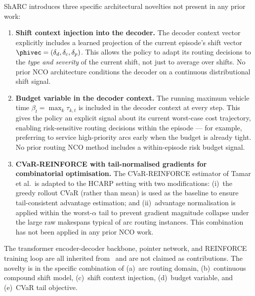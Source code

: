 \documentclass[11pt]{article}
\begin{document}
ShARC introduces three specific architectural novelties not present in any
prior work:

\begin{enumerate}
    \item \textbf{Shift context injection into the decoder.}
    The decoder context vector explicitly includes a learned projection of
    the current episode's shift vector $\phivec = (\delta_d, \delta_c,
    \delta_p)$.  This allows the policy to adapt its routing decisions
    to the \emph{type and severity} of the current shift, not just to
    average over shifts.  No prior NCO architecture conditions the decoder
    on a continuous distributional shift signal.

    \item \textbf{Budget variable in the decoder context.}
    The running maximum vehicle time $\beta_t = \max_k \tau_{k,t}$ is
    included in the decoder context at every step.  This gives the policy
    an explicit signal about its current worst-case cost trajectory,
    enabling risk-sensitive routing decisions within the episode --- for
    example, preferring to service high-priority arcs early when the budget
    is already tight.  No prior routing NCO method includes a within-episode
    risk budget signal.

    \item \textbf{CVaR-REINFORCE with tail-normalised gradients for
    combinatorial optimisation.}
    The CVaR-REINFORCE estimator of Tamar et al.\ is adapted to the HCARP
    setting with two modifications: (i)~the greedy rollout CVaR (rather than
    mean) is used as the baseline to ensure tail-consistent advantage
    estimation; and (ii)~advantage normalisation is applied within the
    worst-$\alpha$ tail to prevent gradient magnitude collapse under the
    large raw makespans typical of arc routing instances.  This combination
    has not been applied in any prior NCO work.
\end{enumerate}

\begin{remark}
The transformer encoder-decoder backbone, pointer network, and REINFORCE
training loop are all inherited from~\cite{kool2019attention} and are not
claimed as contributions.  The novelty is in the specific combination of
(a)~arc routing domain, (b)~continuous compound shift model, (c)~shift
context injection, (d)~budget variable, and (e)~CVaR tail objective.
\end{remark}
\end{document}
